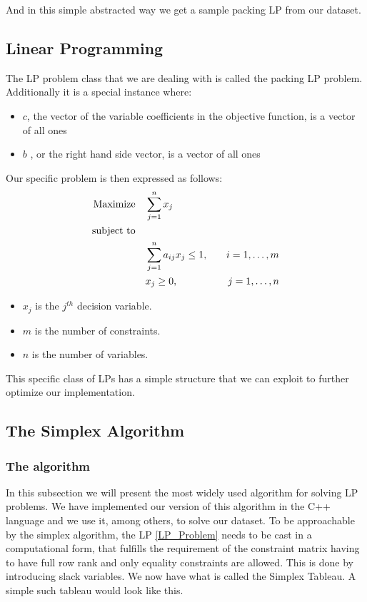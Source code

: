 And in this simple abstracted way we get a sample packing LP from our dataset.
\subsection{Linear Programming}
The LP problem class that we are dealing with is called the packing LP problem. Additionally
it is a special instance where:
\begin{itemize}
    \item \( c \), the vector of the variable coefficients in the objective function,
    is a vector of all ones
    \item \( b \) , or the right hand side vector,  is a vector of all ones
\end{itemize}
Our specific problem is then expressed as follows:
\begin{align}
    \text{Maximize} \quad & \sum_{j=1}^{n} x_j \notag \\
    \text{subject to} \quad & \notag \\
    & \sum_{j=1}^{n} a_{ij} x_j \leq 1, \quad & i = 1, \ldots, m \notag \\
    & x_j \geq 0, \quad & j = 1, \ldots, n \label{LP_Problem}
\end{align}
\begin{itemize}
    \item \( x_j \) is the \( j^{th} \) decision variable.
    \item \( m \) is the number of constraints.
    \item \( n \) is the number of variables.
\end{itemize}
This specific class of LPs has a simple structure that we can exploit
to further optimize our implementation.
\subsection{The Simplex Algorithm}
\subsubsection{The algorithm}
In this subsection we will present the most widely used algorithm for solving
LP problems. We have implemented our version  of this algorithm in the C++ language 
and we use it, among others, to solve our dataset.
To be approachable by the simplex algorithm, the LP \ref*{LP_Problem} needs to be cast in a 
computational form, that fulfills the requirement of the constraint matrix having to have
full row rank and only equality  constraints are allowed. This is done by introducing slack
variables. 
We now have what is called the Simplex Tableau. A simple such tableau would look like this.


